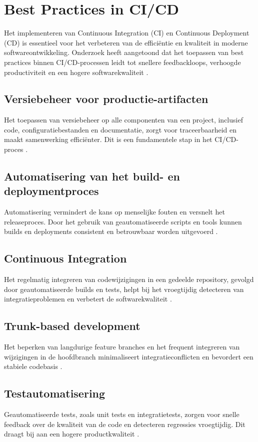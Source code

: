 \section{Best Practices in CI/CD}

Het implementeren van Continuous Integration (CI) en Continuous Deployment (CD) is essentieel voor het verbeteren van de efficiëntie en kwaliteit in moderne softwareontwikkeling. Onderzoek heeft aangetoond dat het toepassen van best practices binnen CI/CD-processen leidt tot snellere feedbackloops, verhoogde productiviteit en een hogere softwarekwaliteit \autocite{shahin2017}.

\subsection{Versiebeheer voor productie-artifacten}
Het toepassen van versiebeheer op alle componenten van een project, inclusief code, configuratiebestanden en documentatie, zorgt voor traceerbaarheid en maakt samenwerking efficiënter. Dit is een fundamentele stap in het CI/CD-proces \autocite{forsgren2018}.

\subsection{Automatisering van het build- en deploymentproces}
Automatisering vermindert de kans op menselijke fouten en versnelt het releaseproces. Door het gebruik van geautomatiseerde scripts en tools kunnen builds en deployments consistent en betrouwbaar worden uitgevoerd \autocite{shahin2017}.

\subsection{Continuous Integration}
Het regelmatig integreren van codewijzigingen in een gedeelde repository, gevolgd door geautomatiseerde builds en tests, helpt bij het vroegtijdig detecteren van integratieproblemen en verbetert de softwarekwaliteit \autocite{forsgren2018}.

\subsection{Trunk-based development}
Het beperken van langdurige feature branches en het frequent integreren van wijzigingen in de hoofdbranch minimaliseert integratieconflicten en bevordert een stabiele codebasis \autocite{forsgren2018}.

\subsection{Testautomatisering}
Geautomatiseerde tests, zoals unit tests en integratietests, zorgen voor snelle feedback over de kwaliteit van de code en detecteren regressies vroegtijdig. Dit draagt bij aan een hogere productkwaliteit \autocite{wang2022}.

